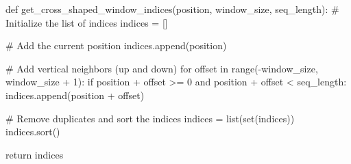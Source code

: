 \begin{python}
def get_cross_shaped_window_indices(position, window_size, seq_length):
    # Initialize the list of indices
    indices = []

    # Add the current position
    indices.append(position)

    # Add vertical neighbors (up and down)
    for offset in range(-window_size, window_size + 1):
        if position + offset >= 0 and position + offset < seq_length:
            indices.append(position + offset)

    # Remove duplicates and sort the indices
    indices = list(set(indices))
    indices.sort()

    return indices
\end{python}
